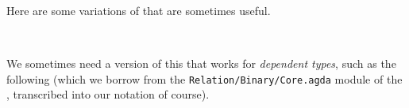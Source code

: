 Here are some variations of  that are sometimes useful.
\ccpad
\begin{code}%
\>[0]\AgdaSpace{}%
\AgdaSymbol{:}%
\>[100I]\AgdaSymbol{\{}\AgdaSpace{}%
\AgdaSymbol{:}\AgdaSpace{}%
\AgdaSpace{}%
\AgdaSpace{}%
\AgdaSymbol{\}\{}\AgdaSpace{}%
\AgdaSymbol{:}\AgdaSpace{}%
\AgdaSpace{}%
\AgdaSpace{}%
\AgdaSymbol{\}\{}\AgdaSpace{}%
\AgdaSpace{}%
\AgdaSymbol{:}\AgdaSpace{}%
\AgdaSpace{}%
\AgdaSpace{}%
\AgdaSymbol{\}}\AgdaSpace{}%
\AgdaSymbol{\{}\AgdaSpace{}%
\AgdaSpace{}%
\AgdaSymbol{:}\AgdaSpace{}%
\AgdaSymbol{\}}\AgdaSpace{}%
\AgdaSpace{}%
\AgdaSpace{}%
\AgdaSpace{}%
\AgdaSpace{}%
\AgdaSpace{}%
\AgdaSpace{}%
\AgdaSpace{}%
\AgdaSpace{}%
\AgdaSpace{}%
\AgdaSpace{}%
\AgdaSpace{}%
\AgdaSpace{}%
\AgdaSpace{}%
\<%
\\
%
\>[0]\AgdaSpace{}%
\AgdaSpace{}%
\AgdaSpace{}%
\AgdaSymbol{=}\AgdaSpace{}%
\<%
\end{code}
\ccpad
We sometimes need a version of this that works for \textit{dependent types}, such as the following (which we borrow from the \texttt{Relation/Binary/Core.agda} module of the \agdastdlib, transcribed into our notation of course).
\ccpad
